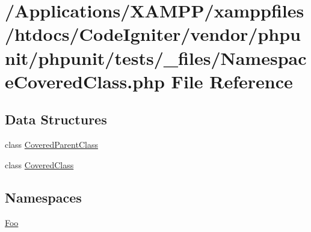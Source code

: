 \hypertarget{phpunit_2tests_2__files_2_namespace_covered_class_8php}{}\section{/\+Applications/\+X\+A\+M\+P\+P/xamppfiles/htdocs/\+Code\+Igniter/vendor/phpunit/phpunit/tests/\+\_\+files/\+Namespace\+Covered\+Class.php File Reference}
\label{phpunit_2tests_2__files_2_namespace_covered_class_8php}
\subsection*{Data Structures}
\begin{DoxyCompactItemize}
\item 
class \mbox{\hyperlink{class_foo_1_1_covered_parent_class}{Covered\+Parent\+Class}}
\item 
class \mbox{\hyperlink{class_foo_1_1_covered_class}{Covered\+Class}}
\end{DoxyCompactItemize}
\subsection*{Namespaces}
\begin{DoxyCompactItemize}
\item 
 \mbox{\hyperlink{namespace_foo}{Foo}}
\end{DoxyCompactItemize}
